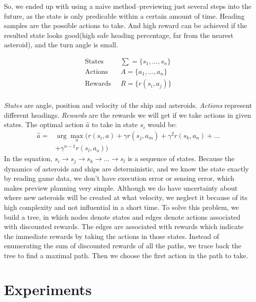 \documentclass[10pt,final,conference]{IEEEtran}
\begin{document}
So, we ended up with using a naive method--previewing just several steps into the future, as the state is only predicable within a certain amount of time. Heading samples are the possible actions to take. And high reward can be achieved if the resulted state looks good(high safe heading percentage, far from the nearest asteroid), and the turn angle is small. 


\begin{equation} \nonumber
\begin{split}
\text{States\ \ \ \ }\ &\sum = \{s_1,..., s_n\}  \\
\text{Actions\ \ \ \ }\; &A = \{a_1,..., a_n\} \\
\text{Rewards\ \ \ \ }\; &R = \{r(s_i, a_j)\} \\
\end{split}
\end{equation}

\textit{States} are angle, position and velocity of the ship and asteroids. \textit{Actions} represent different headings. \textit{Rewards} are the rewards we will get if we take actions in given states.
The optimal action $\hat{a}$ to take in state $s_i$ would be:
\begin{equation} \nonumber
\begin{split}
\hat{a} =& \arg\max_{a}  ( r(s_i, a) + \gamma r(s_j, a_m) + \gamma^2 r(s_k, a_n) + ... \\
 &+ \gamma^{n-1} r(s_l, a_o)  ) 
\end{split}
\end{equation}
In the equation, $s_i \rightarrow s_j \rightarrow s_k \rightarrow ... \rightarrow  s_l$ is a sequence of states.
Because the dynamics of asteroids and ships are deterministic, and we know the state exactly by reading game data, we don't have execution error or sensing error, which makes preview planning very simple. Although we do have uncertainty about where new asteroids will be created at what velocity, we neglect it because of its high complexity and not influential in a short time. To solve this problem, we build a tree, in which nodes denote states and edges denote actions associated with discounted rewards. The edges are associated with rewards which indicate the immediate rewards by taking the actions in those states. Instead of enumerating the sum of discounted rewards of all the paths, we trace back the tree to find a maximal path. Then we choose the first action in the path to take. 

\section{Experiments}
\end{document}
